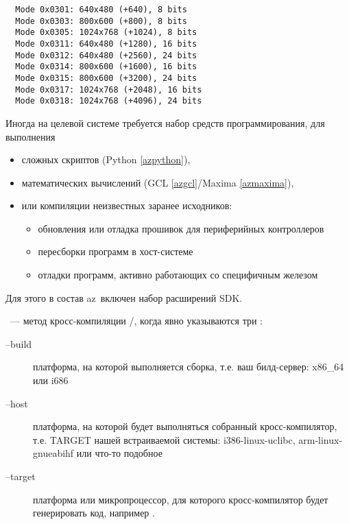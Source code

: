 \begin{verbatim}
  Mode 0x0301: 640x480 (+640), 8 bits
  Mode 0x0303: 800x600 (+800), 8 bits
  Mode 0x0305: 1024x768 (+1024), 8 bits
  Mode 0x0311: 640x480 (+1280), 16 bits
  Mode 0x0312: 640x480 (+2560), 24 bits
  Mode 0x0314: 800x600 (+1600), 16 bits
  Mode 0x0315: 800x600 (+3200), 24 bits
  Mode 0x0317: 1024x768 (+2048), 16 bits
  Mode 0x0318: 1024x768 (+4096), 24 bits
\end{verbatim}

\secup

 \label{aznetboot}

 \label{azfirmware}


\secdown

Иногда на целевой системе требуется набор средств программирования, для
выполнения

\begin{itemize}
  \item
сложных скриптов (Python \ref{azpython}),
  \item
математических вычислений (GCL \ref{azgcl}/Maxima \ref{azmaxima}),
  \item
или компиляции неизвестных заранее исходников:
\begin{itemize}
 \item обновления или отладка прошивок для периферийных контроллеров
 \item пересборки программ в хост-системе
 \item отладки программ, активно работающих со специфичным железом
\end{itemize}
\end{itemize}

Для этого в состав az\linux\ включен набор расширений SDK.


\ --- метод кросс-компиляции
/, когда явно указываются три :

\begin{description}
  \item[--build] платформа, на которой выполняется сборка, т.е. ваш
  билд-сервер: x86\_64 или i686
  \item[--host] платформа, на которой будет выполняться собранный
  кросс-компилятор, т.е. TARGET нашей встраиваемой системы: i386-linux-uclibc,
  arm-linux-gnueabihf или что-то подобное
  \item[--target] платформа или микропроцессор, для которого кросс-компилятор
  будет генерировать код, например .
\end{description}

